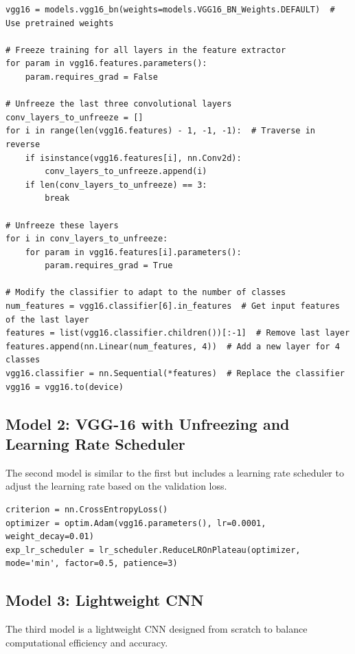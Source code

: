 \begin{verbatim}
vgg16 = models.vgg16_bn(weights=models.VGG16_BN_Weights.DEFAULT)  # Use pretrained weights

# Freeze training for all layers in the feature extractor
for param in vgg16.features.parameters():
    param.requires_grad = False

# Unfreeze the last three convolutional layers
conv_layers_to_unfreeze = []
for i in range(len(vgg16.features) - 1, -1, -1):  # Traverse in reverse
    if isinstance(vgg16.features[i], nn.Conv2d):
        conv_layers_to_unfreeze.append(i)
    if len(conv_layers_to_unfreeze) == 3:
        break

# Unfreeze these layers
for i in conv_layers_to_unfreeze:
    for param in vgg16.features[i].parameters():
        param.requires_grad = True

# Modify the classifier to adapt to the number of classes
num_features = vgg16.classifier[6].in_features  # Get input features of the last layer
features = list(vgg16.classifier.children())[:-1]  # Remove last layer
features.append(nn.Linear(num_features, 4))  # Add a new layer for 4 classes
vgg16.classifier = nn.Sequential(*features)  # Replace the classifier
vgg16 = vgg16.to(device)
\end{verbatim}

\subsection{Model 2: VGG-16 with Unfreezing and Learning Rate Scheduler}

The second model is similar to the first but includes a learning rate scheduler to adjust the learning rate based on the validation loss.

\begin{verbatim}
criterion = nn.CrossEntropyLoss()
optimizer = optim.Adam(vgg16.parameters(), lr=0.0001, weight_decay=0.01)
exp_lr_scheduler = lr_scheduler.ReduceLROnPlateau(optimizer, mode='min', factor=0.5, patience=3)
\end{verbatim}

\subsection{Model 3: Lightweight CNN}

The third model is a lightweight CNN designed from scratch to balance computational efficiency and accuracy.

